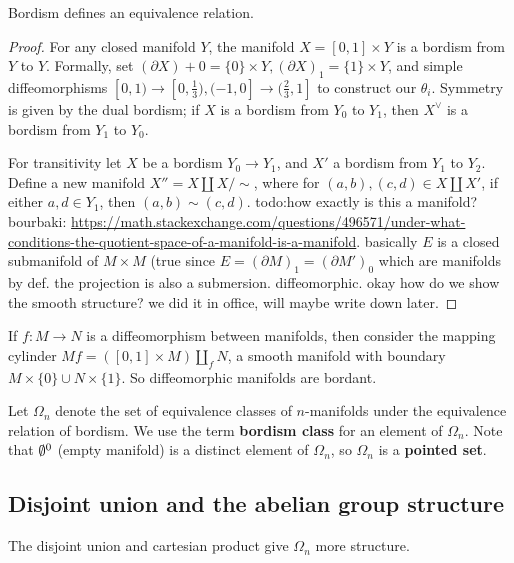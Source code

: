 \begin{lemma}
    Bordism defines an equivalence relation.
\end{lemma}
\begin{proof}
    For any closed manifold $Y$, the manifold $X=[0,1] \times Y$ is a bordism from $Y$ to $Y$. Formally, set $(\partial X)+0= \{0\} \times Y, (\partial X)_1= \{1\} \times Y$, and simple diffeomorphisms $[0,1) \to [0, \frac{1}{3}), (-1,0] \to (\frac{2}{3},1]$ to construct our $\theta_i $. Symmetry is given by the dual bordism; if $X$ is a bordism from $Y_0$ to $Y_1$, then $X^{\vee}$ is a bordism from $Y_1$ to $Y_0$. 

    For transitivity let $X$ be a bordism $Y_0 \to Y_1$, and $X'$ a bordism from $Y_1$ to $Y_2$. Define a new manifold $X''= X \amalg X /\sim$, where for $(a,b),(c,d) \in X \amalg X'$, if either $a,d \in Y_1$, then $(a,b)\sim(c,d)$. {\color{red}todo:how exactly is this a manifold? bourbaki: \url{https://math.stackexchange.com/questions/496571/under-what-conditions-the-quotient-space-of-a-manifold-is-a-manifold}. basically $E$ is a closed submanifold of $M \times M$ (true since $E=(\partial M)_1=(\partial M')_0$ which are manifolds by def. the projection is also a submersion. diffeomorphic. okay how do we show the smooth structure? we did it in office, will maybe write down later.} 

\end{proof}
\begin{example}
    If $f \colon M \to N$ is a diffeomorphism between manifolds, then consider the mapping cylinder $Mf=([0,1]\times M)\amalg_f N$, a smooth manifold with boundary $M \times \{0\} \cup N\times \{1\} $. So diffeomorphic manifolds are bordant.
\end{example}
Let $\Omega_n $ denote the set of equivalence classes of $n$-manifolds under the equivalence relation of bordism. We use the term \textbf{bordism class} for an element of $\Omega_n $. Note that $\emptyset^0$ (empty manifold) is a distinct element of $\Omega_n $, so $\Omega_n $ is a \textbf{pointed set}.

\subsection{Disjoint union and the abelian group structure}
The disjoint union and cartesian product give $\Omega_n $ more structure.

